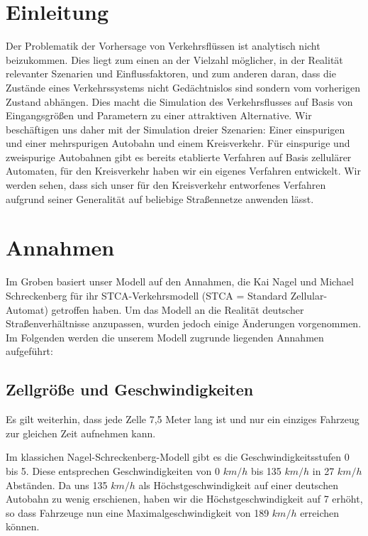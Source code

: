 \documentclass[10pt, a4paper]{article}
\newcommand\nsm{Nagel-Schreckenberg-Modell }
\begin{document}
\section{Einleitung}
\label{sec:einleitung}
Der Problematik der Vorhersage von Verkehrsflüssen ist analytisch nicht beizukommen. Dies liegt zum einen an der Vielzahl möglicher, in der Realität relevanter Szenarien und Einflussfaktoren, und zum anderen daran, dass die Zustände eines Verkehrssystems nicht Gedächtnislos sind sondern vom vorherigen Zustand abhängen. Dies macht die Simulation des Verkehrsflusses auf Basis von Eingangsgrößen und Parametern zu einer attraktiven Alternative. Wir beschäftigen uns daher mit der Simulation dreier Szenarien: Einer einspurigen und einer mehrspurigen Autobahn und einem Kreisverkehr. Für einspurige und zweispurige Autobahnen gibt es bereits etablierte Verfahren auf Basis zellulärer Automaten, für den Kreisverkehr haben wir ein eigenes Verfahren entwickelt. Wir werden sehen, dass sich unser für den Kreisverkehr entworfenes Verfahren aufgrund seiner Generalität auf beliebige Straßennetze anwenden lässt.

\newpage
\section{Annahmen}
\label{sec:annahmen}

Im Groben basiert unser Modell auf den Annahmen, die Kai Nagel und Michael Schreckenberg \cite{nagel-schreckenberg} für ihr STCA-Verkehrsmodell (STCA = Standard Zellular-Automat) getroffen haben. Um das Modell an die Realität deutscher Straßenverhältnisse anzupassen, wurden jedoch einige Änderungen vorgenommen.
Im Folgenden werden die unserem Modell zugrunde liegenden Annahmen aufgeführt:%

\subsection{Zellgröße und Geschwindigkeiten}

Es gilt weiterhin, dass jede Zelle 7,5 Meter lang ist und nur ein einziges Fahrzeug zur gleichen Zeit aufnehmen kann.

Im klassichen \nsm gibt es die Geschwindigkeitsstufen 0 bis 5. Diese entsprechen Geschwindigkeiten von 0 $km/h$ bis 135 $km/h$ in 27 $km/h$ Abständen. Da uns 135 $km/h$ als Höchstgeschwindigkeit auf einer deutschen Autobahn zu wenig erschienen, haben wir die Höchstgeschwindigkeit auf 7 erhöht, so dass Fahrzeuge nun eine Maximalgeschwindigkeit von 189 $km/h$ erreichen können.
\end{document}
